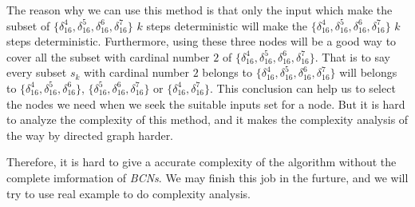 The reason why we can use this method is that only the input which make the subset of $\{\delta_{16}^4,\delta_{16}^5,\delta_{16}^6,\delta_{16}^7\}$ $k$ steps deterministic will make the $\{\delta_{16}^4,\delta_{16}^5,\delta_{16}^6,\delta_{16}^7\}$ $k$ steps deterministic. Furthermore, using these three nodes will be a good way to cover all the subset with cardinal number $2$ of $\{\delta_{16}^4,\delta_{16}^5,\delta_{16}^6,\delta_{16}^7\}$. That is to say every subset $s_k$ with cardinal number $2$ belongs to $\{\delta_{16}^4,\delta_{16}^5,\delta_{16}^6,\delta_{16}^7\}$ will belongs to $\{\delta_{16}^4,\delta_{16}^5,\delta_{16}^6\}$, $\{\delta_{16}^5,\delta_{16}^6,\delta_{16}^7\}$ or $\{\delta_{16}^4,\delta_{16}^7\}$. This conclusion can help us to select the nodes we need when we seek the suitable inputs set for a node. But it is hard to analyze the complexity of this method, and it makes the complexity analysis of the way by directed graph harder.

Therefore, it is hard to give a accurate complexity of the algorithm without the complete imformation of {\em BCNs}. We may finish this job in the furture, and we will try to use real example to do complexity analysis.
